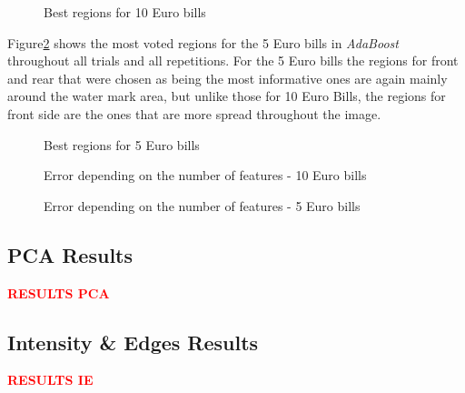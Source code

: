 \documentclass[11pt,twocolumn]{article}
\newcommand{\todo}[1]{\textcolor{red}{\textbf{#1}}}
\begin{document}
		\begin{figure}[!hbtp]
			\centering
			\caption{Best regions for 10 Euro bills}
			\label{haar_regions10}
		\end{figure}

		Figure\ref{haar_regions5} shows the most voted regions for the 5 Euro bills in \emph{AdaBoost} throughout all trials and all repetitions. For the 5 Euro bills the regions for front and rear that were chosen as being the most informative ones are again mainly around the water mark area, but unlike those for 10 Euro Bills, the regions for front side are the ones that are more spread throughout the image.

		\begin{figure}[!hbtp]
			\centering
			\caption{Best regions for 5 Euro bills}
			\label{haar_regions5}
		\end{figure}


		\begin{figure}[!hbtp]
			\centering
			\caption{Error depending on the number of features - 10 Euro bills}
			\label{haar_plot10}
		\end{figure} 
		\begin{figure}[!hbtp]
			\centering
			\caption{Error depending on the number of features - 5 Euro bills}
			\label{haar_plot5}
		\end{figure} 
	
		\subsection{PCA Results}\label{sec:pca_results}
			\todo{RESULTS PCA}
	
		\subsection{Intensity \& Edges Results}\label{sec:ie_results}
			\todo{RESULTS IE}
	
\end{document}

